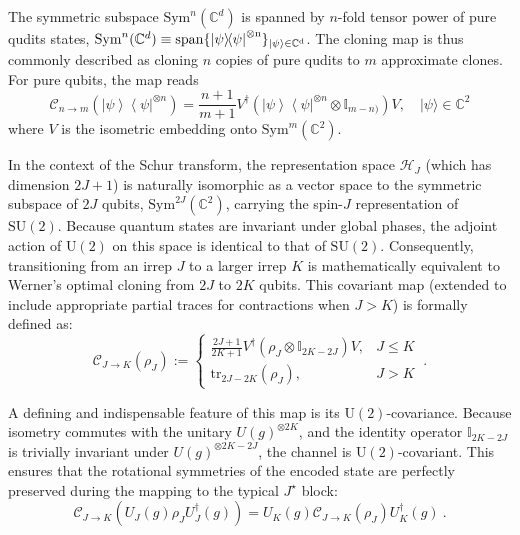\documentclass[a4paper,onecolumn,11pt]{quantumarticle}
\newcommand{\ket}[1]{| #1 \rangle}
\newcommand{\ketbra}[2]{\left|#1\right\rangle\!\!\left\langle #2\right|}
\def\h{\mathcal{H}}
\def\id{\mathbb{I}}
\def\C{\mathcal{C}}
\begin{document}
The symmetric subspace $\mathrm{Sym}^n(\mathbb{C}^d)$ is spanned by $n$-fold tensor power of pure qudits states, $\mathrm{Sym}^n(\mathbb{C}^d)\equiv\rm{span}\{\ketbra{\psi}{\psi}^{\otimes n}\}_{\ket{\psi}\in\mathbb C^d}$. The cloning map is thus commonly described as cloning $n$ copies of pure qudits to $m$ approximate clones. For pure qubits, the map reads
\begin{equation}
    \C_{n\to m}(\ketbra{\psi}{\psi}^{\otimes n}) =
        \frac{n+1}{m+1} V^\dagger(\ketbra{\psi}{\psi}^{\otimes n} \otimes \id_{m-n)})V,\quad \ket{\psi}\in\mathbb C^2
\end{equation}
where $V$ is the isometric embedding onto $\mathrm{Sym}^m(\mathbb{C}^2)$.

In the context of the Schur transform, the representation space $\h_J$ (which has dimension $2J+1$) is naturally isomorphic as a vector space to the symmetric subspace of $2J$ qubits, $\mathrm{Sym}^{2J}(\mathbb{C}^2)$, carrying the spin-$J$ representation of $\mathrm{SU}(2)$. Because quantum states are invariant under global phases, the adjoint action of $\mathrm{U}(2)$ on this space is identical to that of $\mathrm{SU}(2)$. Consequently, transitioning from an irrep $J$ to a larger irrep $K$ is mathematically equivalent to Werner's optimal cloning from $2J$ to $2K$ qubits. This covariant map (extended to include appropriate partial traces for contractions when $J > K$) is formally defined as:
\begin{equation}\label{eq:qubitcloning}
    \mathcal{C}_{J\to K}(\rho_J) :=  \begin{cases} 
        \frac{2J+1}{2K+1} V^\dagger(\rho_J \otimes \id_{2K-2J})V, & J \le K \\ 
        \mathrm{tr}_{2J-2K}(\rho_J), & J > K 
    \end{cases}\ .
\end{equation}

A defining and indispensable feature of this map is its U$(2)$-covariance. Because isometry commutes with the unitary $U(g)^{\otimes 2K}$, and the identity operator $\id_{2K-2J}$ is trivially invariant under $U(g)^{\otimes 2K-2J}$, the channel is $\mathrm{U}(2)$-covariant. This ensures that the rotational symmetries of the encoded state are perfectly preserved during the mapping to the typical $J^\star$ block:
\begin{equation}
    \mathcal{C}_{J\to K}\left(U_J(g) \rho_J U_J^\dagger(g)\right) = U_K(g) \mathcal{C}_{J\to K}(\rho_J) U_K^\dagger(g)\ .
\end{equation}
\end{document}
